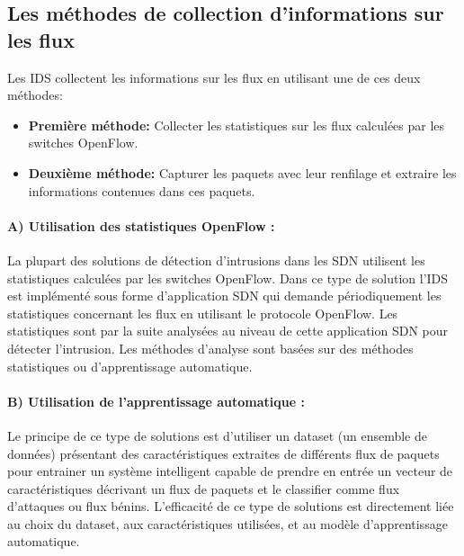 \subsection{Les méthodes de collection d'informations sur les flux}
Les IDS collectent les informations sur les flux en utilisant une de ces deux méthodes:\\
\begin{itemize}
	\item[] \textbf{Première méthode:} Collecter les statistiques sur les flux calculées par les switches OpenFlow.
	\item[] \textbf{Deuxième méthode:} Capturer les paquets avec leur renfilage et extraire les informations contenues dans ces paquets. 
\end{itemize}

\paragraph{A) Utilisation des statistiques OpenFlow :}
La plupart des solutions de détection d’intrusions dans les SDN utilisent les statistiques calculées par les switches OpenFlow. Dans ce type de solution l’IDS est implémenté sous forme d’application SDN qui demande périodiquement les statistiques concernant les flux en utilisant le protocole OpenFlow. Les statistiques sont par la suite analysées au niveau de cette application SDN pour détecter l’intrusion. Les méthodes d’analyse sont basées sur des méthodes statistiques ou d’apprentissage automatique.

\paragraph{B) Utilisation de l’apprentissage automatique :}
Le principe de ce type de solutions est d’utiliser un dataset (un ensemble de données) présentant des caractéristiques extraites de différents flux de paquets pour entrainer un système intelligent capable de prendre en entrée un vecteur de caractéristiques décrivant un flux de paquets et le classifier comme flux d’attaques ou flux bénins. 
L’efficacité de ce type de solutions est directement liée au choix du dataset, aux caractéristiques utilisées,  et au modèle d’apprentissage automatique.

